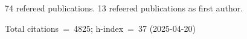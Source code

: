74 refereed publications. 13 refeered publications as first author.

Total citations~=~4825; h-index~=~37 (2025-04-20)